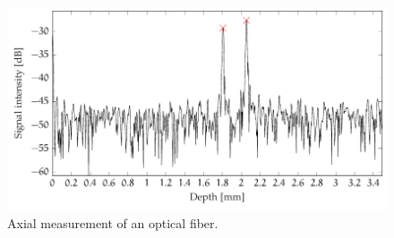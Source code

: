 \begin{figure}[hbt]
	\myfloatalign
	\includegraphics[width=\linewidth]{gfx/tikz/thickness-measure/fiber-thickness}
	\caption{Axial measurement of an optical fiber.}\label{fig:fiber-thickness}
\end{figure}



